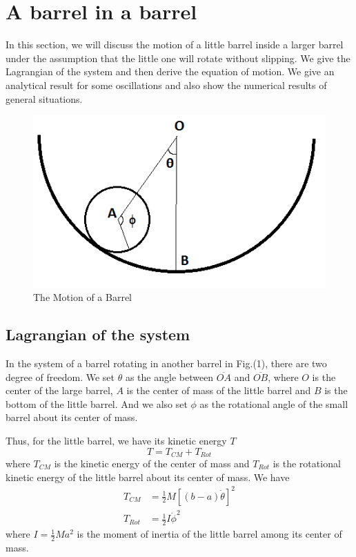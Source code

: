 \documentclass[%
 reprint,
 amsmath,amssymb,
 aps,
]{revtex4-1}
\begin{document}
\section{A barrel in a barrel}
In this section, we will discuss the motion of a little barrel inside a larger barrel under the assumption that the little one will rotate without slipping. We give the Lagrangian of the system and then derive the equation of motion. We give an analytical result for some oscillations and also show the numerical results of general situations.
\begin{figure}[h!]
\centering
\includegraphics[scale=0.5]{Barrelception.png}
\caption{The Motion of a Barrel}
\label{fig1}
\end{figure}
\subsection{Lagrangian of the system}
In the system of a barrel rotating in another barrel in Fig.(1), there are two degree of freedom. We set $\theta$ as the angle between $\overline{OA}$ and $\overline{OB}$, where $O$ is the center of the large barrel, $A$ is the center of mass of the little barrel and $B$ is the bottom of the little barrel. And we also set $\phi$ as the rotational angle of the small barrel about its center of mass.

Thus, for the little barrel, we have its kinetic energy $T$
\begin{equation}
    T=T_{CM}+T_{Rot}
\end{equation}
where $T_{CM}$ is the kinetic energy of the center of mass and $T_{Rot}$ is the rotational kinetic energy of the little barrel about its center of mass. We have
\begin{equation}
\begin{aligned}
T_{CM}&=\frac{1}{2}M[(b-a)\dot{\theta}]^2\\
T_{Rot}&=\frac{1}{2}I\dot{\phi}^2
\end{aligned}
\end{equation}
where $I=\frac{1}{2}Ma^2$ is the moment of inertia of the little barrel among its center of mass.
\end{document}

